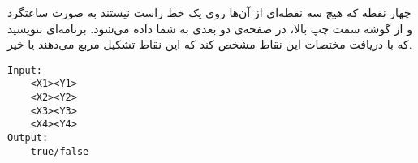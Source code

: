 \documentclass[../main.tex]{subfiles}
\begin{document}

چهار نقطه که هیچ سه نقطه‌ای از آن‌ها روی یک خط راست نیستند به صورت ساعتگرد و از گوشه سمت چپ بالا، در صفحه‌ی دو بعدی به شما داده می‌شود.
برنامه‌ای بنویسید که با دریافت مختصات این نقاط مشخص کند که این نقاط تشکیل مربع می‌دهند یا خیر.

\begin{latin}
\begin{verbatim}
Input:
    <X1><Y1>
    <X2><Y2>
    <X3><Y3>
    <X4><Y4>
Output:
    true/false
\end{verbatim}
\end{latin}
\end{document}
